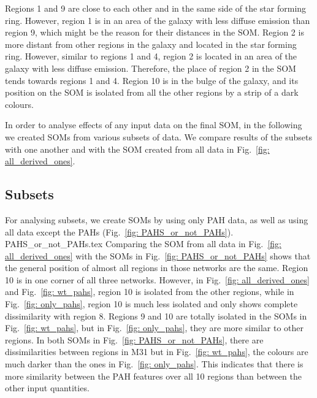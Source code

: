     Regions 1 and 9 are close to each other and in the same side of the star forming ring. 
    However, region 1 is in an area of the galaxy with less diffuse \halpha emission than region 9, which might be the reason for their distances in the SOM.
    Region 2 is more distant from other regions in the galaxy and located in the star forming ring.
    However, similar to regions 1 and 4, region 2 is located in an area of the galaxy with less diffuse \halpha emission.
    Therefore, the place of region 2 in the SOM tends towards regions 1 and 4. 
    Region 10 is in the bulge of the galaxy, and its position on the SOM is isolated from all the other regions by a strip of a dark colours. 
    
    In order to analyse effects of any input data on the final SOM, in the following we created SOMs from various subsets of data.
    We compare results of the subsets with one another and with the SOM created from all data in Fig.~\ref{fig: all_derived_ones}.

    \subsection{Subsets}
    \label{sec: subsets}
    
            For analysing subsets, we create SOMs by using only PAH data, as well as using all data except the PAHs (Fig.~\ref{fig: PAHS_or_not_PAHs}).
             {PAHS_or_not_PAHs.tex}
            Comparing the SOM from all data in Fig.~\ref{fig: all_derived_ones} with the SOMs in Fig.~\ref{fig: PAHS_or_not_PAHs} shows that the general position of almost all regions in those networks are the same. 
            Region 10 is in one corner of all three networks.
            However, in Fig.~\ref{fig: all_derived_ones} and Fig.~\ref{fig: wt_pahs}, region 10 is isolated from the other regions, while in Fig.~\ref{fig: only_pahs}, region 10 is much less isolated and only shows complete dissimilarity with region 8.
            Regions 9 and 10 are totally isolated in the SOMs in Fig.~\ref{fig: wt_pahs}, but in Fig.~\ref{fig: only_pahs}, they are more similar to other regions.
            In both SOMs in Fig.~\ref{fig: PAHS_or_not_PAHs}, there are dissimilarities between regions in M31 but in Fig.~\ref{fig: wt_pahs}, the colours are much darker than the ones in Fig.~\ref{fig: only_pahs}.
            This indicates that there is more similarity between the PAH features over all 10 regions than between the other input quantities.
            
